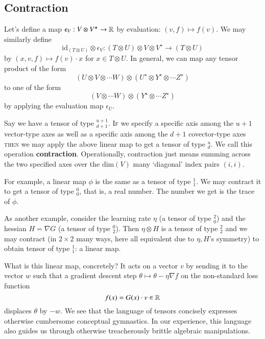         \subsection{Contraction}
            Let's define a map $\epsilon_V:V\otimes V^\star \to \mathbb{R}$ by
            evaluation: $(v,f) \mapsto f(v)$.  We may similarly define
            $$
                {\text{id}_{(T\otimes U)}}\otimes \epsilon_V:(T\otimes
                U)\otimes V\otimes V^\star \to (T\otimes U)
            $$
            by $(x,v,f) \mapsto f(v)\cdot x$ for $x\in T\otimes U$.
            In general, we can map any tensor
            product of the form
            $$
                (U \otimes
                V \otimes \cdots
                W) \otimes
                (U^\star \otimes
                Y^\star \otimes \cdots
                Z^\star)
            $$
            to one of the form
            $$
                (V \otimes \cdots
                W) \otimes
                (Y^\star \otimes \cdots
                Z^\star)
            $$
            by applying the evaluation map $\epsilon_U$.

            Say we have a tensor of type $^{u+1}_{d+1}$.  \textsc{If} we
            specify a specific axis among the ${u+1}$ vector-type axes as well
            as a specific axis among the ${d+1}$ covector-type axes
            \textsc{then} we may apply the above linear map to get a tensor of
            type $^u_d$.  We call this operation \textbf{contraction}.  
            Operationally, contraction just means summing across the two specified
            axes over the $\text{dim}(V)$ many `diagonal' index pairs $(i,i)$.

            For example, a linear map $\phi$ is the same as a tensor of type
            $^1_1$.  We may contract it to get a tensor of type $^0_0$, that is,
            a real number.  The number we get is the trace of $\phi$.

            As another example, consider the learning rate $\eta$ (a tensor
            of type $^2_0$) and the hessian $H=\nabla G$ (a tensor of type
            $^0_2$).  Then $\eta \otimes H$ is a tensor of type $^2_2$ and we
            may contract (in $2\times 2$ many ways, here all equivalent due to
            $\eta,H$'s symmetry) to obtain tensor of type $^1_1$: a linear map.

            What is this linear map, concretely?  It acts on a vector $v$ by
            sending it to the vector $w$ such that a gradient descent step
            $\theta \mapsto \theta - \eta \nabla f$ on the non-standard loss
            function $$ f(x) = G(x)\cdot v \in \mathbb{R} $$ displaces $\theta$ by
            $-w$.
            We see that the language of tensors concisely expresses otherwise
            cumbersome conceptual gymnastics.  In our experience, this language
            also guides us through otherwise treacherously brittle algebraic
            manipulations.



